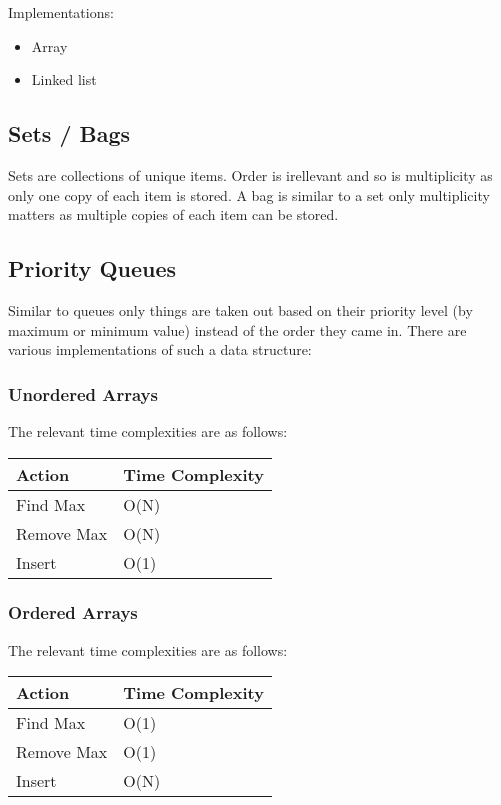 \documentclass[11pt]{article}
\begin{document}
Implementations:
\begin{itemize}
\item Array
\item Linked list
\end{itemize}

\subsection*{Sets / Bags}
\label{sec:org2b4bd11}
Sets are collections of unique items. Order is irellevant and so is multiplicity as only one copy of each item is stored.
A bag is similar to a set only multiplicity matters as multiple copies of each item can be stored.

\subsection*{Priority Queues}
\label{sec:org4445f8a}
Similar to queues only things are taken out based on their priority level (by maximum or minimum value) instead of the order they came in.
There are various implementations of such a data structure:

\subsubsection*{Unordered Arrays}
\label{sec:org90fde00}

The relevant time complexities are as follows:
\begin{center}
\begin{tabular}{ll}
Action & Time Complexity\\
\hline
Find Max & O(N)\\
Remove Max & O(N)\\
Insert & O(1)\\
\end{tabular}
\end{center}

\subsubsection*{Ordered Arrays}
\label{sec:orgca496ca}

The relevant time complexities are as follows:
\begin{center}
\begin{tabular}{ll}
Action & Time Complexity\\
\hline
Find Max & O(1)\\
Remove Max & O(1)\\
Insert & O(N)\\
\end{tabular}
\end{center}
\end{document}
